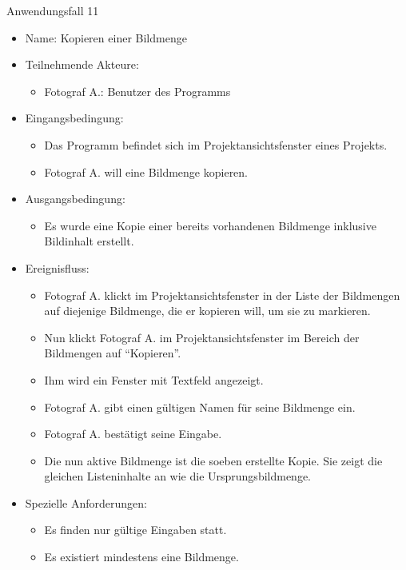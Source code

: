 \begin{itemize}
	\begin{description}
		\item[Anwendungsfall 11]
	\end{description}
	
	\begin{itemize}
		\item Name: Kopieren einer Bildmenge
		\item Teilnehmende Akteure:
		\begin{itemize}
			\item	Fotograf A.: Benutzer des Programms		
		\end{itemize}
		\item Eingangsbedingung:
		\begin{itemize}
			\item	Das Programm befindet sich im Projektansichtsfenster eines Projekts.
			\item Fotograf A. will eine Bildmenge kopieren.
		\end{itemize}
		\item Ausgangsbedingung:
		\begin{itemize}
			\item	Es wurde eine Kopie einer bereits vorhandenen Bildmenge inklusive Bildinhalt erstellt.	
		\end{itemize}
		\item Ereignisfluss:
		\begin{itemize}
			\item Fotograf A. klickt im Projektansichtsfenster in der Liste der Bildmengen auf diejenige Bildmenge, die er kopieren will, um sie zu markieren.		
			\item Nun klickt Fotograf A. im Projektansichtsfenster im Bereich der Bildmengen auf "`Kopieren"'.
			\item Ihm wird ein Fenster mit Textfeld angezeigt.
			\item Fotograf A. gibt einen gültigen Namen für seine Bildmenge ein.
			\item Fotograf A. bestätigt seine Eingabe.
			\item Die nun aktive Bildmenge ist die soeben erstellte Kopie. Sie zeigt die gleichen Listeninhalte an wie die Ursprungsbildmenge.
		\end{itemize}
		\item Spezielle Anforderungen:
		\begin{itemize}
			\item	Es finden nur gültige Eingaben statt.
			\item Es existiert mindestens eine Bildmenge.
		\end{itemize}			
	\end{itemize}
	

\end{itemize}
